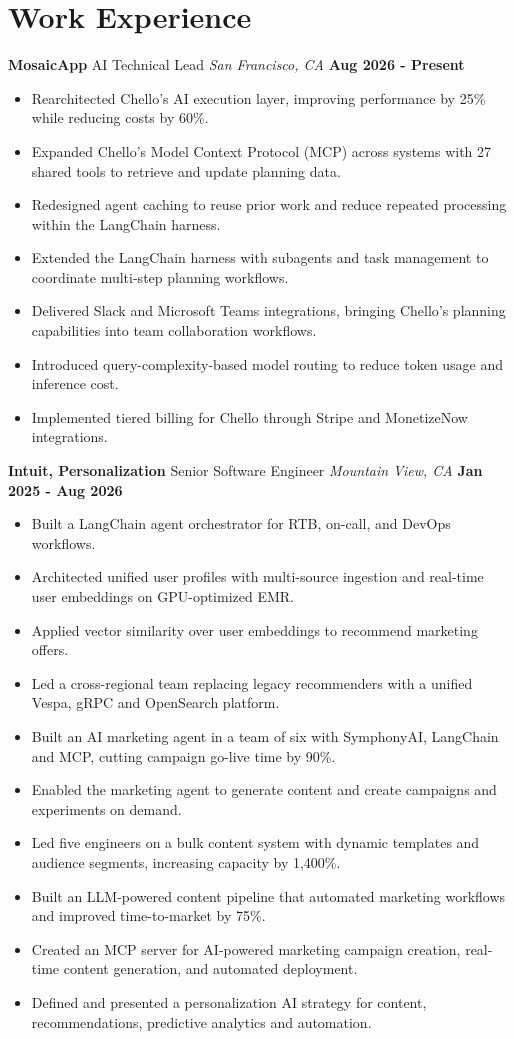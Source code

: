 \documentclass[10pt, letterpaper]{article}
\newcommand{\jobentry}[4]{
  \noindent\textbf{#1} \hfill #2 \hfill \textit{#3} \hfill \textbf{#4}
}
\begin{document}
\section{Work Experience}
\jobentry{MosaicApp}{AI Technical Lead}{San Francisco, CA}{Aug 2026 - Present}
\begin{itemize}
\item Rearchitected Chello's AI execution layer, improving performance by 25\% while reducing costs by 60\%.
\item Expanded Chello's Model Context Protocol (MCP) across systems with 27 shared tools to retrieve and update planning data.
\item Redesigned agent caching to reuse prior work and reduce repeated processing within the LangChain harness.
\item Extended the LangChain harness with subagents and task management to coordinate multi-step planning workflows.
\item Delivered Slack and Microsoft Teams integrations, bringing Chello's planning capabilities into team collaboration workflows.
\item Introduced query-complexity-based model routing to reduce token usage and inference cost.
\item Implemented tiered billing for Chello through Stripe and MonetizeNow integrations.
\end{itemize}
\jobentry{Intuit, Personalization}{Senior Software Engineer}{Mountain View, CA}{Jan 2025 - Aug 2026}
\begin{itemize}
\item Built a LangChain agent orchestrator for RTB, on-call, and DevOps workflows.
\item Architected unified user profiles with multi-source ingestion and real-time user embeddings on GPU-optimized EMR.
\item Applied vector similarity over user embeddings to recommend marketing offers.
\item Led a cross-regional team replacing legacy recommenders with a unified Vespa, gRPC and OpenSearch platform.
\item Built an AI marketing agent in a team of six with SymphonyAI, LangChain and MCP, cutting campaign go-live time by 90\%.
\item Enabled the marketing agent to generate content and create campaigns and experiments on demand.
\item Led five engineers on a bulk content system with dynamic templates and audience segments, increasing capacity by 1,400\%.
\item Built an LLM-powered content pipeline that automated marketing workflows and improved time-to-market by 75\%.
\item Created an MCP server for AI-powered marketing campaign creation, real-time content generation, and automated deployment.
\item Defined and presented a personalization AI strategy for content, recommendations, predictive analytics and automation.
\end{itemize}
\end{document}
